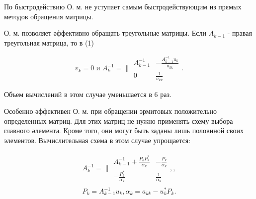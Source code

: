 \documentclass[10pt]{article}
\begin{document}
По быстродействию О. м. не уступает самым быстродействующим из прямых методов обращения матрицы.



О. м. позволяет әффективно обращать треугольные матрицы. Если $A_{k-1}$ - правая треугольная матрица, то в (1)



\[

v_{k}=0 \text { и } A_{k}^{-1}=\| \begin{array}{cc}

A_{k-1}^{-1} & -\frac{A_{\bar{k}-1}^{-1} u_{k}}{a_{k k}} \\

0 & \frac{1}{a_{k k}}

\end{array} .

\]



Объем вычислений в этом случае уменьшается в 6 раз.



Особенно әффективен О. м. при обращении эрмитовых положительно определенных матриц. Для этих матриц не нужно применять схему выбора главного әлемента. Кроме того, они могут быть заданы лишь половиной своих элементов. Вычислительная схема в этом случае упрощается:



\[

\begin{gathered}

A_{k}^{-1}=\| \begin{array}{rr}

A_{k-1}^{-1}+\frac{P_{k} P_{k}^{*}}{\alpha_{k}} & -\frac{P_{k}}{\alpha_{k}} \\

-\frac{P_{k}^{*}}{\alpha_{k}} & \frac{1}{\alpha_{k}}

\end{array},, \\

P_{k}=A_{k-1}^{-1} u_{k}, \alpha_{k}=a_{k k}-u_{k}^{*} P_{k} .

\end{gathered}

\]
\end{document}

